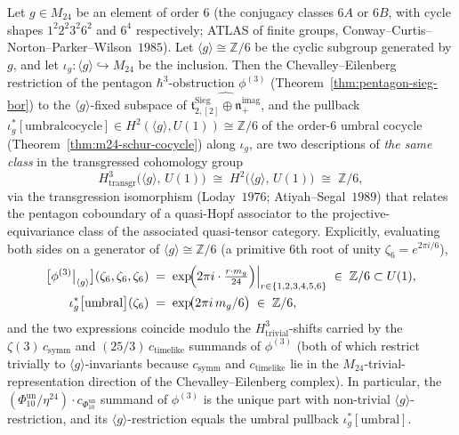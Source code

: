 \begin{theorem}
\label{thm:pentagon-umbral-agreement}
Let $g\in M_{24}$ be an element of order $6$ (the conjugacy classes $6A$ or $6B$,
with cycle shapes $1^2 2^2 3^2 6^2$ and $6^4$ respectively; ATLAS of finite groups,
Conway--Curtis--Norton--Parker--Wilson~$1985$). Let $\langle g\rangle \cong
\mathbb{Z}/6$ be the cyclic subgroup generated by $g$, and let $\iota_g\colon
\langle g\rangle \hookrightarrow M_{24}$ be the inclusion. Then the
Chevalley--Eilenberg restriction of the pentagon $\hbar^3$-obstruction $\phi^{(3)}$
(Theorem~\ref{thm:pentagon-sieg-bor}) to the $\langle g\rangle$-fixed subspace of
$\widehat{\mathfrak{t}^{\mathrm{Sieg}}_{2,[2]}\oplus\mathfrak{n}_+^{\mathrm{imag}}}$,
and the pullback $\iota_g^*[\mathrm{umbral cocycle}]\in H^2(\langle g\rangle, U(1))
\cong \mathbb{Z}/6$ of the order-$6$ umbral cocycle (Theorem~\ref{thm:m24-schur-cocycle})
along $\iota_g$, are two descriptions of \emph{the same class} in the transgressed
cohomology group
\[
 H^3_{\mathrm{transgr}}\bigl(\langle g\rangle,\, U(1)\bigr)
 \;\cong\;
 H^2\bigl(\langle g\rangle,\, U(1)\bigr)
 \;\cong\;
 \mathbb{Z}/6,
\]
via the transgression isomorphism (Loday~$1976$;
Atiyah--Segal~$1989$) that relates the pentagon coboundary of a quasi-Hopf
associator to the projective-equivariance class of the associated quasi-tensor
category. Explicitly, evaluating both sides on a generator of $\langle g\rangle
\cong \mathbb{Z}/6$ (a primitive $6$th root of unity $\zeta_6 = e^{2\pi i/6}$),
\begin{align}
 \bigl[\phi^{(3)}\bigr|_{\langle g\rangle}\bigr](\zeta_6,\zeta_6,\zeta_6)
 &\;=\;
 \exp\!\Bigl(2\pi i\cdot \tfrac{r\cdot m_g}{24}\Bigr)\Bigr|_{r\in\{1,2,3,4,5,6\}}
 \;\in\; \mathbb{Z}/6 \subset U(1),
 \label{eq:pentagon-eval}\\
 \iota_g^*\bigl[\mathrm{umbral}\bigr](\zeta_6)
 &\;=\;
 \exp\!\bigl(2\pi i\,m_g/6\bigr)
 \;\in\; \mathbb{Z}/6,
 \label{eq:umbral-eval}
\end{align}
and the two expressions coincide modulo the $H^3_{\mathrm{trivial}}$-shifts
carried by the $\zeta(3)\,c_{\mathrm{symm}}$ and $(25/3)\,c_{\mathrm{timelike}}$
summands of $\phi^{(3)}$ (both of which restrict trivially to
$\langle g\rangle$-invariants because $c_{\mathrm{symm}}$ and $c_{\mathrm{timelike}}$
lie in the $M_{24}$-trivial-representation direction of the Chevalley--Eilenberg
complex). In particular, the $(\Phi_{10}^{\mathrm{un}}/\eta^{24})\cdot c_{\Phi_{10}^{\mathrm{un}}}$ summand of
$\phi^{(3)}$ is the unique part with non-trivial $\langle g\rangle$-restriction,
and its $\langle g\rangle$-restriction equals the umbral pullback
$\iota_g^*[\mathrm{umbral}]$.
\end{theorem}

